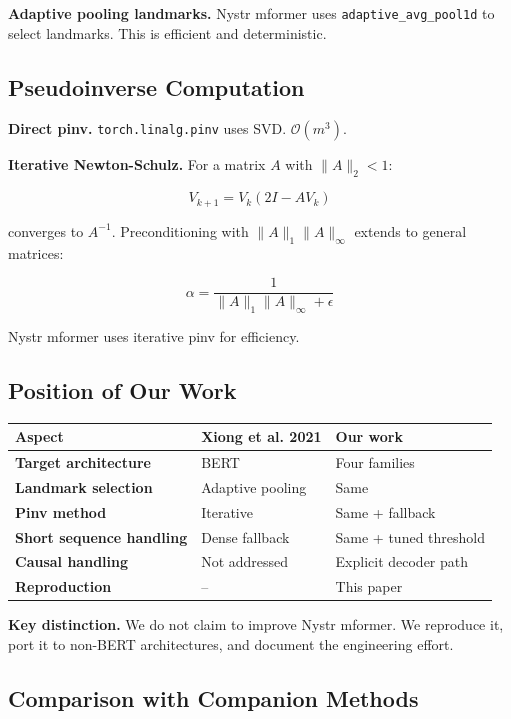 \textbf{Adaptive pooling landmarks.} Nystr mformer uses \texttt{adaptive\_avg\_pool1d} 
to select landmarks. This is efficient and deterministic.

\subsection{Pseudoinverse Computation}

\textbf{Direct pinv.} \texttt{torch.linalg.pinv} uses SVD. $\mathcal{O}(m^3)$.

\textbf{Iterative Newton-Schulz.} For a matrix $A$ with $\|A\|_2 < 1$:

\[
V_{k+1} = V_k (2I - A V_k)
\tag{2.2}
\]

converges to $A^{-1}$. Preconditioning with $\|A\|_1 \|A\|_\infty$ 
extends to general matrices:

\[
\alpha = \frac{1}{\|A\|_1 \|A\|_\infty + \epsilon}
\tag{2.3}
\]

Nystr mformer uses iterative pinv for efficiency.

\subsection{Position of Our Work}

\begin{table}[H]
\centering
\small
\begin{tabular}{lll}
\toprule
\textbf{Aspect} & \textbf{Xiong et al. 2021} & \textbf{Our work} \\
\midrule
\textbf{Target architecture} & BERT & Four families \\
\textbf{Landmark selection} & Adaptive pooling & Same \\
\textbf{Pinv method} & Iterative & Same + fallback \\
\textbf{Short sequence handling} & Dense fallback & Same + tuned threshold \\
\textbf{Causal handling} & Not addressed & Explicit decoder path \\
\textbf{Reproduction} & -- & This paper \\
\bottomrule
\end{tabular}
\end{table}

\textbf{Key distinction.} We do not claim to improve Nystr mformer. We reproduce 
it, port it to non-BERT architectures, and document the engineering effort.

\subsection{Comparison with Companion Methods}

